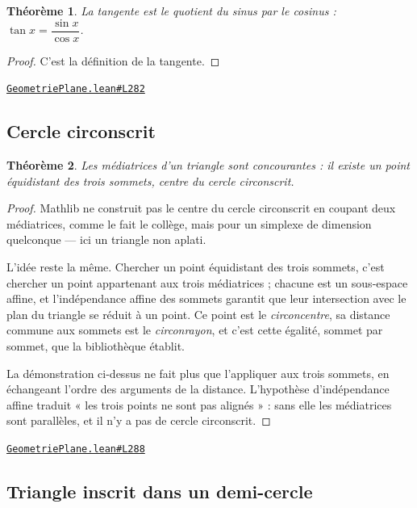 \documentclass[11pt,a4paper]{article}
\theoremstyle{definition}
\theoremstyle{plain}
\newtheorem{theoreme}{Théorème}
\newcommand{\source}[2]{\par\smallskip\noindent\hfill{\footnotesize\href{#1}{\texttt{#2}}}\par\smallskip}
\begin{document}
\begin{theoreme}
La tangente est le quotient du sinus par le cosinus : $\tan x = \dfrac{\sin x}{\cos x}$.
\end{theoreme}

\begin{proof}
C'est la définition de la tangente.
\end{proof}
\source{https://github.com/Commutator-IO/learn-lean/blob/main/courses/01-college/02-geometrie-plane/GeometriePlane.lean\#L282}{GeometriePlane.lean\#L282}

\subsection{Cercle circonscrit}

\begin{theoreme}
Les médiatrices d'un triangle sont concourantes : il existe un point équidistant des
trois sommets, centre du cercle circonscrit.
\end{theoreme}

\begin{proof}
Mathlib ne construit pas le centre du cercle circonscrit en coupant deux médiatrices, comme
le fait le collège, mais pour un simplexe de dimension quelconque — ici un triangle non
aplati.

L'idée reste la même. Chercher un point équidistant des trois sommets, c'est chercher un
point appartenant aux trois médiatrices ; chacune est un sous-espace affine, et
l'indépendance affine des sommets garantit que leur intersection avec le plan du triangle se
réduit à un point. Ce point est le \emph{circoncentre}, sa distance commune aux sommets est
le \emph{circonrayon}, et c'est cette égalité, sommet par sommet, que la bibliothèque
établit.

La démonstration ci-dessus ne fait plus que l'appliquer aux trois sommets, en échangeant
l'ordre des arguments de la distance. L'hypothèse d'indépendance affine traduit « les trois
points ne sont pas alignés » : sans elle les médiatrices sont parallèles, et il n'y a pas de
cercle circonscrit.
\end{proof}
\source{https://github.com/Commutator-IO/learn-lean/blob/main/courses/01-college/02-geometrie-plane/GeometriePlane.lean\#L288}{GeometriePlane.lean\#L288}

\subsection{Triangle inscrit dans un demi-cercle}
\end{document}

